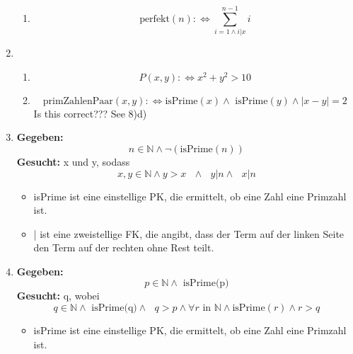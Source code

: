 \documentclass[a4paper]{article}
\begin{document}
\begin{enumerate}
\begin{enumerate}
			\item
			\begin{equation*}
				\text{perfekt}(n) :\Leftrightarrow \displaystyle\sum_{i = 1 \land i | x}^{n - 1} i			
			\end{equation*}
		\end{enumerate}
		
		\item
		\begin{enumerate}
			\item
			\begin{equation*}
				P(x, y) :\Leftrightarrow x^{2} + y^{2} > 10
			\end{equation*}
			
			\item
			\begin{equation*}
				\text{primZahlenPaar}(x, y) :\Leftrightarrow \text{isPrime}(x) \land \text{ isPrime}(y) \land |x - y| = 2
			\end{equation*}
			\newline
			Is this correct??? See 8)d)
		\end{enumerate}
		
		\item
		\textbf{Gegeben:}
		\begin{equation*}
			n \in \mathbb{N} \land \lnot(\text{isPrime}(n)) 
		\end{equation*}
		\textbf{Gesucht: } x und y, sodass
		\begin{equation*}
			x, y \in \mathbb{N} \land y > x \text{ } \land \text{ } y|n \land \text{ } x|n		
		\end{equation*}
		\begin{itemize}
			\item isPrime ist eine einstellige PK, die ermittelt, ob eine Zahl eine Primzahl ist.
			\item | ist eine zweistellige FK, die angibt, dass der Term auf der linken Seite den Term auf der rechten ohne Rest teilt.
		\end{itemize}
		
		\item
		\textbf{Gegeben:}
		\begin{equation*}
			p \in \mathbb{N} \land \text{ isPrime(p)}
		\end{equation*}
		\textbf{Gesucht: } q, wobei
		\begin{equation*}
			q \in \mathbb{N} \land \text{ isPrime(q)} \land \text{ } q > p \land \forall r \text{ in } \mathbb{N} \land \text{isPrime}(r) \land r > q
		\end{equation*}
		\begin{itemize}
			\item isPrime ist eine einstellige PK, die ermittelt, ob eine Zahl eine Primzahl ist.
		\end{itemize}
		

\end{enumerate}
\end{document}
